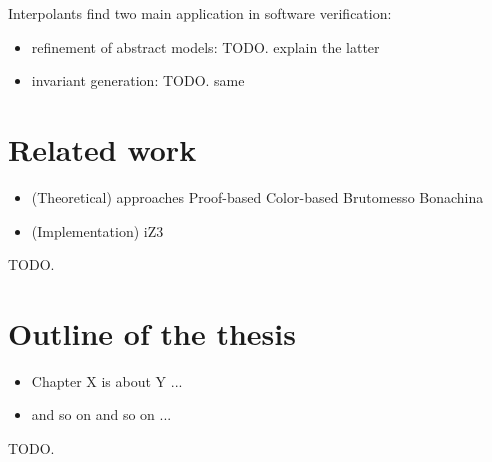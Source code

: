 Interpolants find two main application in software verification:

\begin{itemize}
  \item refinement of abstract models: TODO. explain the latter
  \item invariant generation: TODO. same
\end{itemize}

\section{Related work}

\begin{itemize}
\item (Theoretical) approaches
Proof-based
Color-based
Brutomesso 
Bonachina
\item (Implementation)
iZ3
\end{itemize}

TODO.

\section{Outline of the thesis}

\begin{itemize}
\item Chapter X is about Y ...
\item and so on and so on ...
\end{itemize}


TODO.

